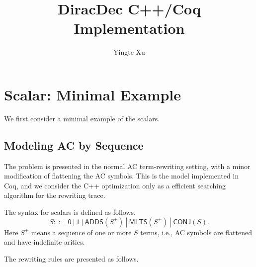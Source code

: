 \documentclass{article}
\title{\textbf{DiracDec C++/Coq Implementation\cite{ExampleCitation}}}
\author{Yingte Xu}
\begin{document}
\maketitle

\section{Scalar: Minimal Example}

We first consider a minimal example of the scalars.

\subsection{Modeling AC by Sequence}
The problem is presented in the normal AC term-rewriting setting, with a minor modification of flattening the AC symbols. This is the model implemented in Coq, and we consider the 
C++ optimization only as a efficient searching algorithm for the rewriting trace.

\newcommand{\ZERO}{\mathsf{0}}
\newcommand{\ONE}{\mathsf{1}}
\newcommand{\ADDS}{\mathsf{ADDS}}
\newcommand{\MLTS}{\mathsf{MLTS}}
\newcommand{\CONJ}{\mathsf{CONJ}}

\begin{definition}
    The syntax for scalars is defined as follows.
    \[ 
    S ::= \ZERO\ |\ \ONE\ |\ \ADDS ( S^+ )\ |\ \MLTS ( S^+ )\ |\ \CONJ(S).
    \]
    Here $S^+$ means a sequence of one or more $S$ terms, i.e., AC symbols are flattened and have indefinite arities.
\end{definition}

The rewriting rules are presented as follows.
\end{document}
